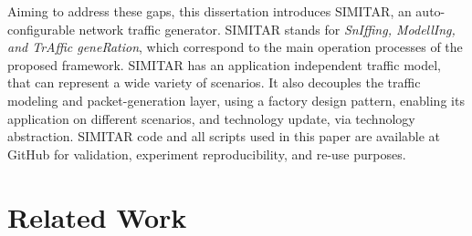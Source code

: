 Aiming to address these gaps, this dissertation introduces \acrshort{SIMITAR}, an auto-configurable network traffic generator. SIMITAR stands for \textit{SnIffing, ModellIng, and TrAffic geneRation}, which correspond to the main operation processes of the proposed framework.  SIMITAR has an application independent traffic model, that can represent a wide variety of scenarios. It also decouples the traffic modeling and packet-generation layer, using a factory design pattern, enabling its application on different scenarios, and technology update, via technology abstraction.  SIMITAR code and all scripts used in this paper are available at GitHub\cite{projeto-github} for validation, experiment reproducibility, and re-use purposes. 


\section{Related Work}


\begin{table}[ht!]
    \centering
    \caption{Comparison of existing traffic generation tools.}
    \label{tab:related-work}
\end{table}



